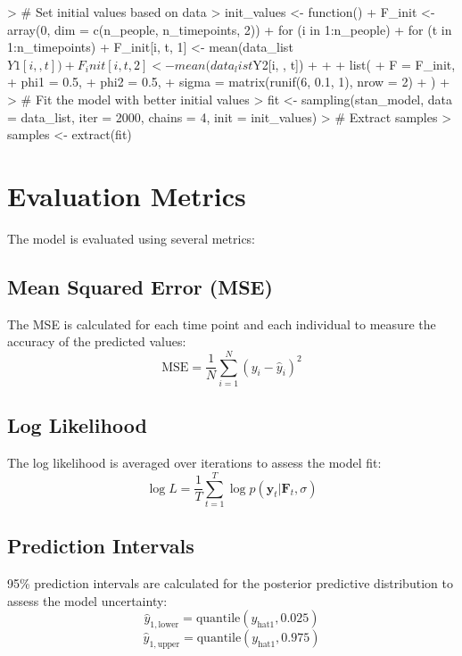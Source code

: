 \documentclass{article}
\begin{document}
\begin{Schunk}
\begin{Sinput}
> # Set initial values based on data
> init_values <- function() {
+   F_init <- array(0, dim = c(n_people, n_timepoints, 2))
+   for (i in 1:n_people) {
+     for (t in 1:n_timepoints) {
+       F_init[i, t, 1] <- mean(data_list$Y1[i, , t])
+       F_init[i, t, 2] <- mean(data_list$Y2[i, , t])
+     }
+   }
+   list(
+     F = F_init,
+     phi1 = 0.5,
+     phi2 = 0.5,
+     sigma = matrix(runif(6, 0.1, 1), nrow = 2)
+   )
+ }
> # Fit the model with better initial values
> fit <- sampling(stan_model, data = data_list, iter = 2000, chains = 4, init = init_values)
> # Extract samples
> samples <- extract(fit)
\end{Sinput}
\end{Schunk}

\section{Evaluation Metrics}
The model is evaluated using several metrics:

\subsection{Mean Squared Error (MSE)}
The MSE is calculated for each time point and each individual to measure the accuracy of the predicted values:
\[
\text{MSE} = \frac{1}{N} \sum_{i=1}^{N} (y_i - \hat{y}_i)^2
\]

\subsection{Log Likelihood}
The log likelihood is averaged over iterations to assess the model fit:
\[
\log L = \frac{1}{T} \sum_{t=1}^{T} \log p(\bm{y}_t | \bm{F}_t, \sigma)
\]

\subsection{Prediction Intervals}
95\% prediction intervals are calculated for the posterior predictive distribution to assess the model uncertainty:
\[
\hat{y}_{1, \text{lower}} = \text{quantile}(y_{\text{hat1}}, 0.025)
\]
\[
\hat{y}_{1, \text{upper}} = \text{quantile}(y_{\text{hat1}}, 0.975)
\]
\end{document}
